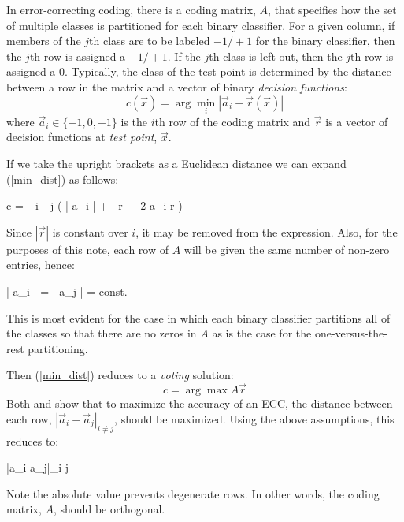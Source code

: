 In error-correcting coding, there is a coding matrix, $A$, that specifies
how the set of multiple classes is partitioned for each binary classifier.
{\revision For a given column, 
if members of the $j$th class are to be labeled $-1/+1$ for the
binary classifier, then the $j$th row is assigned a $-1/+1$.
If the $j$th class is left out, then the $j$th row is assigned a $0$.}
Typically, the class of the test point is determined by the distance between
a row in the matrix and a vector of binary {\it decision functions}:
\begin{equation}
	c(\vec x) = \arg \min_i | \vec a_i - \vec r(\vec x) |
	\label{min_dist}
\end{equation}
where $\vec a_i\in \lbrace -1,0,+1 \rbrace$ 
is the $i$th row of the coding matrix and 
$\vec r$ is a vector of decision functions at {\it test point}, $\vec x$.
{\revision
If we take the upright brackets as a Euclidean distance we can expand (\ref{min_dist}) as follows:
\begin{eqnnon}
	c = \arg \min_i \sum_j \left ( | \vec a_i | + | \vec r | - 2 \vec a_i  \cdot \vec r \right ) 
\end{eqnnon}
Since $| \vec r |$ is constant over $i$, it may be removed from the expression.
Also, for the purposes of this note,
each row of $A$ will be given the same number of non-zero entries, hence:
\begin{eqnnon}
	| \vec a_i | = | \vec a_j | = const.
\end{eqnnon}
This is most evident for the case in which each binary classifier partitions
all of the classes so that there are no zeros in $A$
as is the case for the one-versus-the-rest partitioning.}
Then (\ref{min_dist}) reduces to a {\it voting} solution:
\begin{equation}
	c = \arg \max A \vec r \label{voting}
\end{equation}
Both \citet{Allwein_etal2000} and \citet{Windeatt_Ghaderi2002} show that to
maximize the accuracy of an ECC, the distance
between each row, $|\vec a_i - \vec a_j|_{i \ne j}$, should be maximized.
Using the above assumptions, this reduces to:
\begin{eqnnon}
	\min |\vec a_i \cdot \vec a_j|_{i \ne j}
\end{eqnnon}
{\revision Note the absolute value prevents degenerate rows.}
In other words, the coding matrix, $A$, should be orthogonal.

